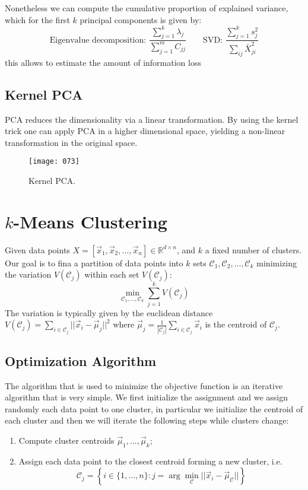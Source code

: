 Nonetheless we can compute the cumulative proportion of explained variance, which for the first \(k\) principal components is given by:
\begin{equation}
    \text{Eigenvalue decomposition: } \frac {\sum_{j=1}^k \lambda_j} {\sum_{j=1}^m C_{jj}} \qquad \text{SVD: } \frac {\sum_{j=1}^k s_j^2} {\sum_{ij} \bar{X}_{ji}^2}
\end{equation}
this allows to estimate the amount of information loss

\subsection{Kernel PCA}
PCA reduces the dimensionality via a linear transformation. By using the kernel trick one can apply PCA in a higher dimensional space, yielding a non-linear transformation in the original space.

\begin{figure}[h!]
    \centering
    \texttt{[image: 073]}
    \caption{Kernel PCA.}
    \label{fig:073}
\end{figure}

\section{\(k\)-Means Clustering}
Given data points \(X = \left[ \vec{x}_1, \vec{x}_2, ..., \vec{x}_n \right] \in \mathbb{R}^{d \times n} \), and \(k\) a fixed number of clusters. Our goal is to fina a partition of data points into \(k\) sets \(\mathcal{C}_1, \mathcal{C}_2, ..., \mathcal{C}_k\) minimizing the variation \(V(\mathcal{C}_j)\) within each set \(V(\mathcal{C}_j)\):
\begin{equation}
    \min_{\mathcal{C}_1, ..., \mathcal{C}_k} \sum_{j=1}^k V(\mathcal{C}_j)
\end{equation}
The variation is typically given by the euclidean distance \(V(\mathcal{C}_j) = \sum_{i \in \mathcal{C}_j} || \vec{x}_i - \vec{\mu}_j ||^2\) where \(\vec{\mu}_j = \frac 1 {|\mathcal{C}_j|} \sum_{i \in \mathcal{C}_j} \vec{x}_i\) is the centroid of \(\mathcal{C}_j\).

\subsection{Optimization Algorithm}
The algorithm that is used to minimize the objective function is an iterative algorithm that is very simple. We first initialize the assignment and we assign randomly each data point to one cluster, in particular we initialize the centroid of each cluster and then we will iterate the following steps while clusters change:
\begin{enumerate}
    \item Compute cluster centroids \(\vec{\mu}_1, ..., \vec{\mu}_k\);
    \item Assign each data point to the closest centroid forming a new cluster, i.e.
    \begin{equation}
        \mathcal{C}_j = \left\{ i \in \{1, ..., n\} : j = \arg \min_\mathcal{C} || \vec{x}_i - \vec{\mu}_\mathcal{C} || \right\}
    \end{equation}
\end{enumerate}

